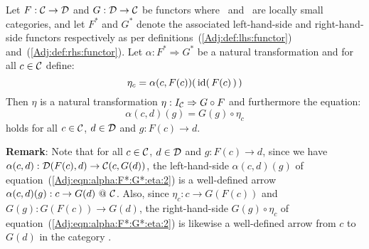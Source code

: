 \begin{prop}\label{Adj:prop:alpha:F*:G*:eta}
    Let $F:\mbox{$\cal C$}\to\mbox{$\cal D$}$ and $G:\mbox{$\cal D$}\to\mbox{$\cal C$}$ be functors where \Cat\ and \Dat\ 
    are locally small categories, and let $F^{*}$ and $G^{*}$ denote the associated
    left-hand-side and right-hand-side functors respectively as per 
    definitions~(\ref{Adj:def:lhs:functor}) and~(\ref{Adj:def:rhs:functor}). Let
    $\alpha:F^{*}\Rightarrow G^{*}$ be a natural transformation and for all
    $c\in\mbox{$\cal C$}$ define:
        \begin{equation}\label{Adj:eqn:alpha:F*:G*:eta:1}
            \eta_{c}=\alpha(c,F(c))(\,\mbox{\rm id}(\,F(c)\,)\,)
        \end{equation}
    Then $\eta$ is a natural transformation $\eta:I_{\cal C}\Rightarrow G\circ F$
    and furthermore the equation:
        \begin{equation}\label{Adj:eqn:alpha:F*:G*:eta:2}
            \alpha(c,d)(g)=G(g)\circ\eta_{c}
        \end{equation}
    holds for all $c\in\mbox{$\cal C$}$, $d\in\mbox{$\cal D$}$ and $g:F(c)\to d$.
\end{prop}
\noindent
{\bf Remark}: Note that for all $c\in\mbox{$\cal C$}$, $d\in\mbox{$\cal D$}$ and $g:F(c)\to d$, since
we have $\alpha(c,d):\mbox{$\cal D$}(F(c),d)\to\mbox{$\cal C$}(c,G(d))$, the left-hand-side
$\alpha(c,d)(g)$ of equation~(\ref{Adj:eqn:alpha:F*:G*:eta:2}) is a well-defined
arrow $\alpha(c,d)(g):c\to G(d)\ @\ \mbox{$\cal C$}$. Also, since $\eta_{c}:c\to
G(F(c))$ and $G(g):G(F(c))\to G(d)$, the right-hand-side $G(g)\circ\eta_{c}$ of
equation~(\ref{Adj:eqn:alpha:F*:G*:eta:2}) is likewise a well-defined arrow
from $c$ to $G(d)$ in the category \Cat.

